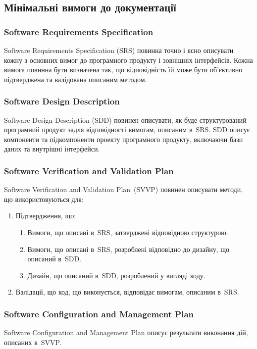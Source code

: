 \documentclass[a4paper,oneside,DIV=12,12pt]{scrartcl}
\begin{document}
			\subsection{Мінімальні вимоги до документації}
				\subsubsection{Software Requirements Specification}
					Software Requirements Specification (SRS) повинна точно і ясно описувати кожну з основних вимог до програмного продукту і зовнішніх інтерфейсів. Кожна вимога повинна бути визначена так, що відповідність їй може бути об'єктивно підтверджена та валідована описаним методом.
					
				\subsubsection{Software Design Description}
					Software Design Description (SDD) повинен описувати, як буде структурований програмний продукт задля відповідності вимогам, описаним в~SRS. SDD описує компоненти та підкомпоненти проекту програмного продукту, включаючи бази даних та внутрішні інтерфейси.
					
				\subsubsection{Software Verification and Validation Plan}
					Software Verification and Validation Plan~(SVVP) повинен описувати методи, що використовуються для:
					\begin{enumerate}
						\item Підтвердження, що:
							\begin{enumerate}
								\item Вимоги, що описані в~SRS, затверджені відповідною структурою.
								\item Вимоги, що описані в~SRS, розроблені відповідно до дизайну, що описаний в~SDD.
								\item Дизайн, що описаний в~SDD, розроблений у вигляді коду.
							\end{enumerate}
						\item Валідації, що код, що виконується, відповідає вимогам, описаним в~SRS.
					\end{enumerate}
					
				\subsubsection{Software Configuration and Management Plan}
					Software Configuration and Management Plan описує результати виконання дій, описаних в~SVVP.
					
\end{document}
